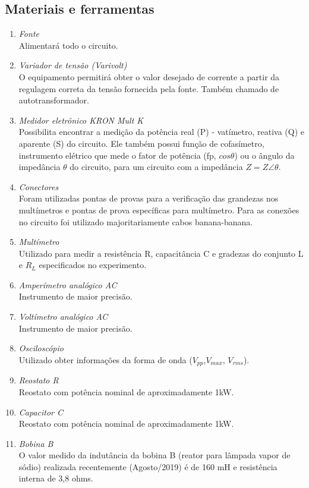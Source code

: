\documentclass[a4paper,12pt,oneside,openany,table,xcdraw]{article}
\begin{document}
\subsection{Materiais e ferramentas} %
\begin{enumerate}[1 - ]
\item \emph{Fonte}\\
Alimentará todo o circuito.

\item \emph{Variador de tensão (Varivolt)}\\
O equipamento permitirá obter o valor desejado de corrente a partir da regulagem correta da tensão fornecida pela fonte. Também chamado de autotransformador.

\item \emph{Medidor eletrônico KRON Mult K}\\
Possibilita encontrar a medição da potência
real (P) - vatímetro, reativa (Q) e aparente (S) do circuito. Ele também possui função de cofasímetro, instrumento elétrico que mede o fator de potência (fp, $cos\theta$) ou o ângulo da impedância $\theta$ do circuito, para um circuito com a impedância $Z = Z\angle \theta$.

\item \emph{Conectores}\\
Foram utilizadas pontas de provas para a verificação das grandezas nos multímetros e pontas de prova específicas para multímetro. Para as conexões no circuito foi utilizado majoritariamente cabos banana-banana.

\item \emph{Multímetro}\\
Utilizado para medir a resistência R, capacitância C e gradezas do conjunto L e $R_L$ especificados no experimento.

\item \emph{Amperímetro analógico AC}\\
Instrumento de maior precisão.

\item \emph{Voltímetro analógico AC}\\
Instrumento de maior precisão.

\item \emph{Osciloscópio}\\
Utilizado obter informações da forma de onda ($V_{pp}$,$V_{max}$, $V_{rms}$).

\item \emph{Reostato R}\\
Reostato com potência nominal de aproximadamente 1kW.

\item \emph{Capacitor C}\\
Reostato com potência nominal de aproximadamente 1kW.

\item \emph{Bobina B}\\
O valor medido da indutância da bobina B (reator para lâmpada vapor de sódio) realizada
recentemente (Agosto/2019) é de 160 mH e resistência interna de 3,8 ohms.

\end{enumerate}
\end{document}
